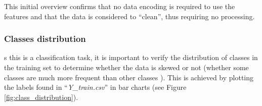 \documentclass[letterpaper,12pt]{article}
\begin{document}
This initial overview confirms that no data encoding is required to use the features and that the data is considered to ``clean'', thus requiring no processing.

\subsubsection{Classes distribution}
\label{sec:classes-distribution}

s this is a classification task, it is important to verify the distribution of classes in the training  set to determine whether the data is skewed or not (whether some classes are much more frequent than other classes \cite{Geron2019}). This is achieved by plotting the labels found in ``\textit{Y\_train.csv}'' in bar charts (see Figure \ref{fig:class_distribution}).\\
\end{document}
